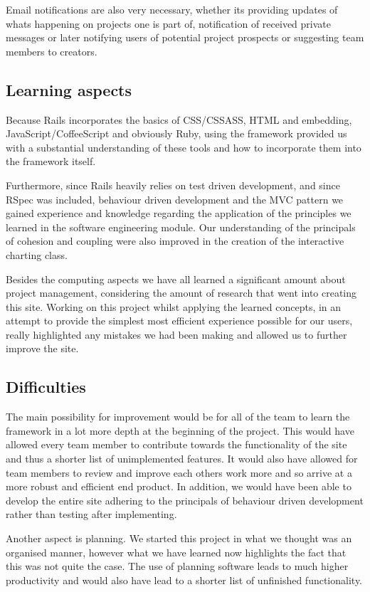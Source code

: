 \documentclass[a4wide, 11pt]{article}
\begin{document}
Email notifications are also very necessary, whether its providing updates of whats happening on projects one is part of, notification of received private messages or later notifying users of potential project prospects or suggesting team members to creators.
 
\subsection{Learning aspects}
Because Rails incorporates the basics of CSS/CSSASS, HTML and embedding, JavaScript/CoffeeScript and obviously Ruby, using the framework provided us with a substantial understanding of these tools and how to incorporate them into the framework itself. 

Furthermore, since Rails heavily relies on test driven development, and since RSpec was included, behaviour driven development and the MVC pattern we gained experience and knowledge regarding the application of the principles we learned in the software engineering module. Our understanding of the principals of cohesion and coupling were also improved in the creation of the interactive charting class.

Besides the computing aspects we have all learned a significant amount about project management, considering the amount of research that went into creating this site. Working on this project whilst applying the learned concepts, in an attempt to provide the simplest most efficient experience possible for our users, really highlighted any mistakes we had been making and allowed us to further improve the site.
\clearpage

\subsection{Difficulties}
The main possibility for improvement would be for all of the team to learn the framework in a lot more depth at the beginning of the project. This would have allowed every team member to contribute towards the functionality of the site and thus a shorter list of unimplemented features. It would also have allowed for team members to review and improve each others work more and so arrive at a more robust and efficient end product. In addition, we would have been able to develop the entire site adhering to the principals of behaviour driven development rather than testing after implementing.

Another aspect is planning. We started this project in what we thought was an organised manner, however what we have learned now highlights the fact that this was not quite the case. The use of planning software leads to much higher productivity and would also have lead to a shorter list of unfinished functionality. 
\end{document}
